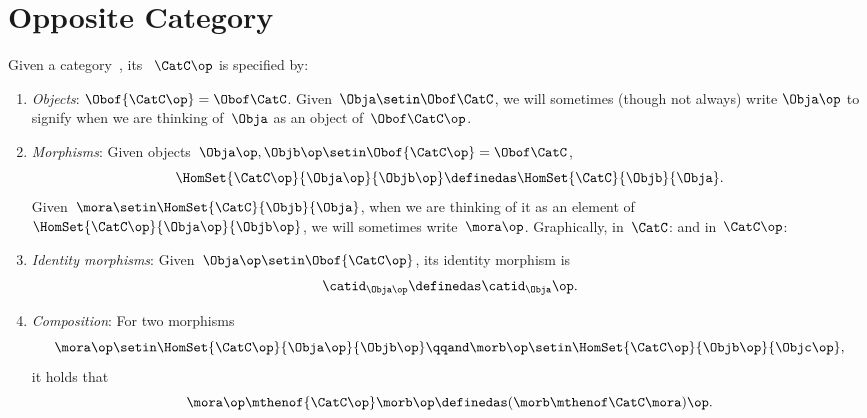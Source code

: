 
\section{Opposite Category}

\begin{ctdefinition}
    \label{def:opposite-category}
    \label{def:oppositecat}
    Given a category~\CatC, its \emph{}~$\CatC\op$ is specified by:
    \begin{enumerate}
        \item \emph{Objects}: $\Obof{\CatC\op} = \Obof\CatC$.
              Given~$\Obja \setin  \Obof\CatC$, we will sometimes (though not always) write $\Obja\op$ to signify when we are thinking of~$\Obja$ as an object of~$\Obof\CatC\op$.

        \item \emph{Morphisms}: Given objects~$\Obja\op,  \Objb\op \setin \Obof{\CatC\op} = \Obof\CatC$,
              \begin{equation}
                  \label{eq:homset-op-cat}
                  \HomSet{\CatC\op}{\Obja\op}{\Objb\op} \definedas \HomSet{\CatC}{\Objb}{\Obja}.
              \end{equation}
              Given~$\mora \setin \HomSet{\CatC}{\Objb}{\Obja}$, when we are thinking of it as an element of $\HomSet{\CatC\op}{\Obja\op}{\Objb\op}$, we will sometimes write~$\mora\op$.
              Graphically, in~$\CatC$:
              and in~$\CatC\op$:
        \item \emph{Identity morphisms}: Given~$\Obja\op \setin \Obof{\CatC\op}$, its identity morphism is
              \begin{equation}
                  \catid_{\Obja\op} \definedas \catid_{\Obja}\op.
              \end{equation}
        \item \emph{Composition}: For two morphisms
              \begin{equation}
                  \mora\op \setin \HomSet{\CatC\op}{\Obja\op}{\Objb\op}
                  \qqand
                  \morb\op \setin \HomSet{\CatC\op}{\Objb\op}{\Objc\op},
              \end{equation}
              it holds that
              \begin{equation}
                  \mora\op \mthenof{\CatC\op} \morb\op \definedas (\morb \mthenof\CatC \mora)\op.
              \end{equation}
    \end{enumerate}
\end{ctdefinition}

